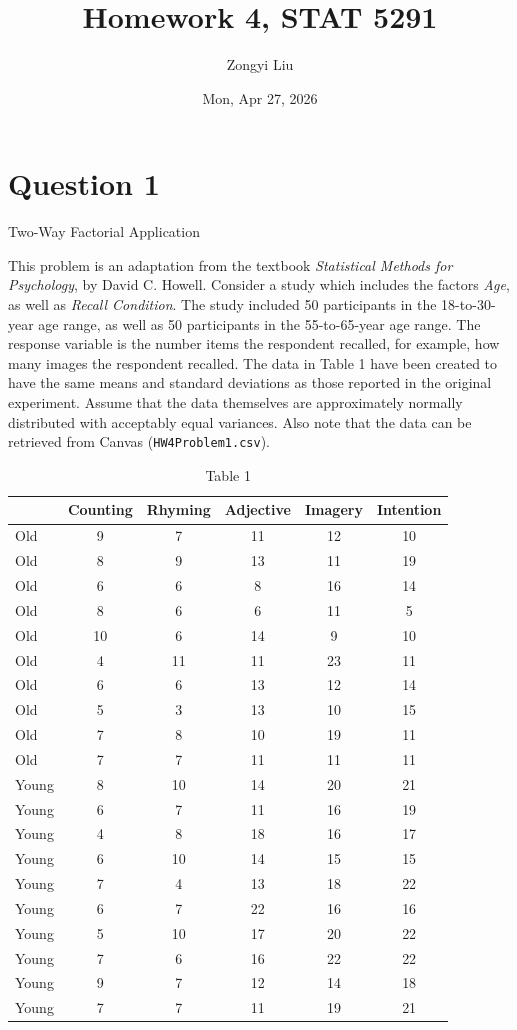 \documentclass[letterpaper]{article}
\title{Homework 4, STAT 5291}
\author{Zongyi Liu}
\date{Mon, Apr 27, 2026}
\begin{document}
		\maketitle

		
		\section{Question 1}
		{\color{deepred}  Two-Way Factorial Application}
		
		This problem is an adaptation from the textbook \textit{Statistical Methods for Psychology}, by David C. Howell. Consider a study which includes the factors \textit{Age}, as well as \textit{Recall Condition}. The study included 50 participants in the 18-to-30-year age range, as well as 50 participants in the 55-to-65-year age range. The response variable is the number items the respondent recalled, for example, how many images the respondent recalled. The data in Table 1 have been created to have the same means and standard deviations as those reported in the original experiment. Assume that the data themselves are approximately normally distributed with acceptably equal variances. Also note that the data can be retrieved from Canvas (\texttt{HW4Problem1.csv}).
		
		\begin{table}[h]
			\centering
			\begin{tabular}{|l|ccccc|}
				\hline
				& Counting & Rhyming & Adjective & Imagery & Intention \\
				\hline
				Old & 9  & 7  & 11 & 12 & 10 \\
				Old & 8  & 9  & 13 & 11 & 19 \\
				Old & 6  & 6  & 8  & 16 & 14 \\
				Old & 8  & 6  & 6  & 11 & 5  \\
				Old & 10 & 6  & 14 & 9  & 10 \\
				Old & 4  & 11 & 11 & 23 & 11 \\
				Old & 6  & 6  & 13 & 12 & 14 \\
				Old & 5  & 3  & 13 & 10 & 15 \\
				Old & 7  & 8  & 10 & 19 & 11 \\
				Old & 7  & 7  & 11 & 11 & 11 \\
				\hline
				Young & 8  & 10 & 14 & 20 & 21 \\
				Young & 6  & 7  & 11 & 16 & 19 \\
				Young & 4  & 8  & 18 & 16 & 17 \\
				Young & 6  & 10 & 14 & 15 & 15 \\
				Young & 7  & 4  & 13 & 18 & 22 \\
				Young & 6  & 7  & 22 & 16 & 16 \\
				Young & 5  & 10 & 17 & 20 & 22 \\
				Young & 7  & 6  & 16 & 22 & 22 \\
				Young & 9  & 7  & 12 & 14 & 18 \\
				Young & 7  & 7  & 11 & 19 & 21 \\
				\hline
			\end{tabular}
			\caption{Table 1}
		\end{table}
	
\end{document}
